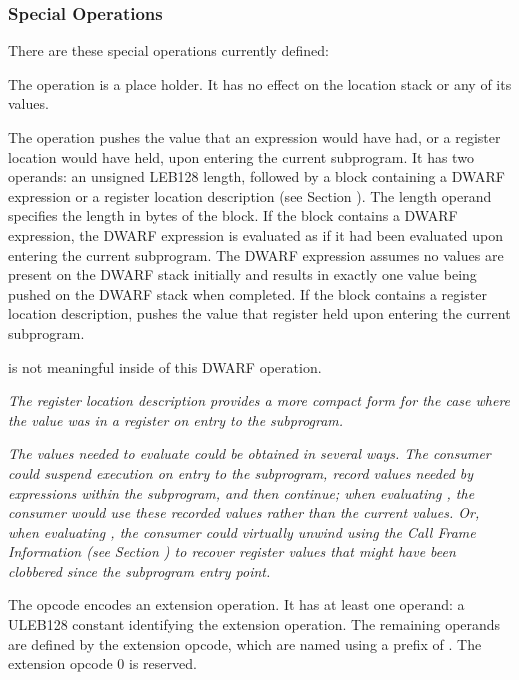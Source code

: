 \subsubsection{Special Operations}
\label{chap:specialoperations}
There 
are these special operations currently defined:
\begin{enumerate}[1. ]
\itembfnl{\DWOPnopTARG}
The \DWOPnopNAME{} operation is a place holder. It has no effect
on the location stack or any of its values.

\itembfnl{\DWOPentryvalueTARG}
The \DWOPentryvalueNAME{} operation pushes 
the value that 
\bb
an expression would have had, or a register location would have held, 
\eb
upon entering the current subprogram.  It has two operands: an 
unsigned LEB128 length, followed by 
a block containing a DWARF expression or a register location description 
(see Section ).  
The length operand specifies the length in bytes of the block. 
If the block contains a DWARF expression,
the DWARF expression is evaluated as if it had been evaluated upon entering
the current subprogram.  The DWARF expression 
assumes no values are present on the DWARF stack initially and results
in exactly one value being pushed on the DWARF stack when completed.
If the block contains a register location
description, \DWOPentryvalueNAME{} pushes the value that register 
\bb
held 
\eb
upon entering the current subprogram. 

\DWOPpushobjectaddress{} is not meaningful inside of this DWARF operation.

\textit{The register location description provides a more compact form for the
case where the value was in a register on entry to the subprogram.}

\textit{The values needed to evaluate \DWOPentryvalueNAME{} could be obtained in
several ways. The consumer could suspend execution on entry to the
subprogram, record values needed by \DWOPentryvalueNAME{} expressions within
the subprogram, and then continue; when evaluating \DWOPentryvalueNAME{},
the consumer would use these recorded values rather than the current
values.  Or, when evaluating \DWOPentryvalueNAME{}, the consumer could
virtually unwind using the Call Frame Information 
(see Section ) 
to recover register values that might have been clobbered since the
subprogram entry point.}

\bb
\itembfnl{\DWOPextendedTARG}
The \DWOPextendedNAME{} opcode encodes an extension operation. It has 
at least one operand: a ULEB128 constant identifying the extension operation. 
The remaining operands are defined by the extension opcode, which are named
using a prefix of \DWOPEXT. 
The extension opcode 0 is reserved.
\eb


\end{enumerate}
